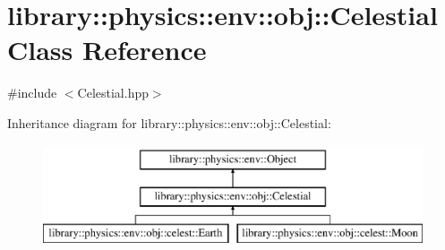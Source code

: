 \hypertarget{classlibrary_1_1physics_1_1env_1_1obj_1_1_celestial}{}\section{library\+:\+:physics\+:\+:env\+:\+:obj\+:\+:Celestial Class Reference}
\label{classlibrary_1_1physics_1_1env_1_1obj_1_1_celestial}


{\ttfamily \#include $<$Celestial.\+hpp$>$}

Inheritance diagram for library\+:\+:physics\+:\+:env\+:\+:obj\+:\+:Celestial\+:\begin{figure}[H]
\begin{center}
\leavevmode
\includegraphics[height=3.000000cm]{classlibrary_1_1physics_1_1env_1_1obj_1_1_celestial}
\end{center}
\end{figure}
